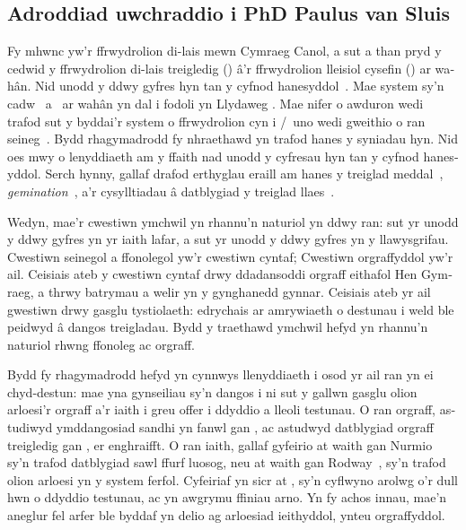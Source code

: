 \begin{welsh}
\chapter{Adroddiad uwchraddio i PhD Paulus van Sluis}
Fy mhwnc yw'r ffrwydrolion di-lais mewn Cymraeg Canol, a sut a than pryd y cedwid y ffrwydrolion di-lais treigledig (\lT) \^a’r ffrwydrolion lleisiol cysefin (\xD) ar wah\^an. Nid unodd y ddwy gyfres hyn tan y cyfnod hanesyddol~\autocite{koch_*cothairche_1990}. Mae system sy'n cadw \lT\ a \xD\ ar wah\^an yn dal i fodoli yn Llydaweg \autocite{falchun_systeme_1951}. Mae nifer o awduron wedi trafod sut y byddai'r system o ffrwydrolion cyn i \lT/\xD\ uno wedi gweithio o ran seineg~\autocite{koch_*cothairche_1990,harvey_aspects_1984,schrijver_old_2011}. Bydd rhagymadrodd fy nhraethawd yn trafod hanes y syniadau hyn. Nid oes  mwy o lenyddiaeth am y ffaith nad unodd y cyfresau hyn tan y cyfnod hanesyddol. Serch hynny, gallaf drafod erthyglau eraill am hanes y treiglad meddal~\autocite{martinet_celtic_1952,sims-williams_dating_1990}, \textit{gemination}~\autocite{greene_gemination_1956}, a'r cysylltiadau \^a datblygiad y treiglad llaes~\autocite{schrijver_spirantization_1999,isaac_chronology_2004}.

Wedyn, mae'r cwestiwn ymchwil yn rhannu'n naturiol yn  ddwy ran: sut yr unodd y ddwy gyfres yn yr iaith lafar, a sut yr unodd y ddwy gyfres yn y llawysgrifau. Cwestiwn seinegol a ffonolegol yw'r cwestiwn cyntaf; Cwestiwn orgraffyddol yw'r ail. Ceisiais ateb y cwestiwn cyntaf drwy ddadansoddi orgraff eithafol Hen Gymraeg, a thrwy batrymau a welir yn y gynghanedd gynnar. Ceisiais ateb yr ail gwestiwn drwy gasglu tystiolaeth: edrychais ar amrywiaeth o destunau i weld ble peidwyd \^a dangos treigladau. Bydd y traethawd ymchwil hefyd yn rhannu'n naturiol rhwng ffonoleg ac orgraff.

Bydd fy rhagymadrodd hefyd yn cynnwys llenyddiaeth i osod yr ail ran yn ei chyd-destun: mae yna gynseiliau sy'n dangos i ni sut y gallwn gasglu olion arloesi'r orgraff a'r iaith i greu offer i ddyddio a lleoli testunau. O ran orgraff, astudiwyd ymddangosiad sandhi  yn fanwl gan \textcite{sims-williams_spread_2010}, ac astudwyd datblygiad orgraff  treigledig gan \textcite{russell_rowynniauc_2003}, er enghraifft. O ran iaith, gallaf gyfeirio at waith gan Nurmio~\autocite*{nurmio_middle_2014,nurmio_studies_????} sy'n trafod datblygiad sawl ffurf luosog, neu at waith gan Rodway~\autocite*{rodway_datable_1998,rodway_absolute_2002,rodway_two_2003,rodway_dating_2013}, sy'n trafod olion arloesi yn y system ferfol. Cyfeiriaf yn sicr at \textcite{rodway_where_2007}, sy'n cyflwyno arolwg o'r dull hwn o ddyddio testunau, ac yn awgrymu ffiniau arno. Yn fy achos innau, mae'n aneglur fel arfer ble byddaf yn delio ag arloesiad ieithyddol, ynteu orgraffyddol. 



\end{welsh}

